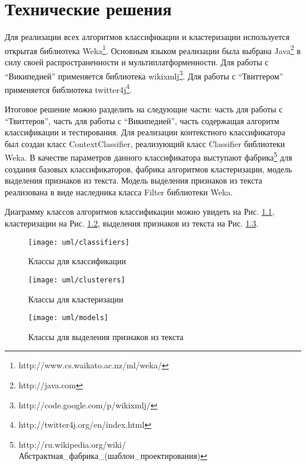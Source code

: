 \chapter{Технические решения}
\label{chap:tech}
Для реализации всех алгоритмов классификации и кластеризации используется открытая библиотека Weka\footnote{http://www.cs.waikato.ac.nz/ml/weka/}. Основным языком реализации была выбрана Java\footnote{http://java.com} в силу своей распространенности и мультиплатформенности. Для работы с ``Википедией'' применяется библиотека wikixmlj\footnote{http://code.google.com/p/wikixmlj/}. Для работы с ``Твиттером'' применяется библиотека twitter4j\footnote{http://twitter4j.org/en/index.html}.

Итоговое решение можно разделить на следующие части: часть для работы с ``Твиттеров'', часть для работы с ``Википедией'', часть содержащая алгоритм классификации и тестирования. Для реализации контекстного классификатора был создан класс ContextClassifier, реализующий класс Classifier библиотеки Weka. В качестве параметров данного классификатора выступают фабрика\footnote{http://ru.wikipedia.org/wiki/Абстрактная\_фабрика\_(шаблон_проектирования)} для создания базовых классификаторов, фабрика алгоритмов кластеризации, модель выделения признаков из текста. Модель выделения признаков из текста реализована в виде наследника класса Filter библиотеки Weka.   

Диаграмму классов алгоритмов классификации можно увидеть на Рис. \ref{fig:uml-classifiers}, кластеризации на Рис. \ref{fig:uml-clusterers}, выделения признаков из текста на Рис. \ref{fig:uml-models}.


\begin{figure}[h!]
  \centering
    \texttt{[image: uml/classifiers]}
    \caption{Классы для классификации}
    \label{fig:uml-classifiers}
\end{figure}


\begin{figure}[h!]
  \centering
    \texttt{[image: uml/clusterers]}
    \caption{Классы для кластеризации}
    \label{fig:uml-clusterers}
\end{figure}


\begin{figure}[h!]
  \centering
    \texttt{[image: uml/models]}
    \caption{Классы для выделения признаков из текста}
    \label{fig:uml-models}
\end{figure}
